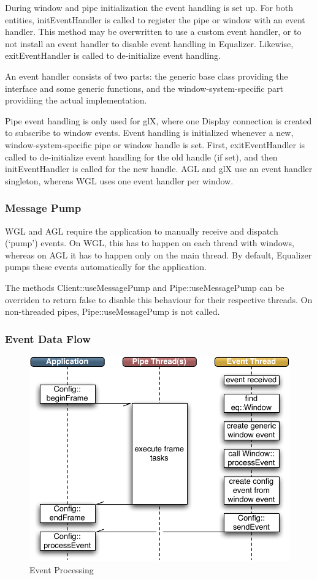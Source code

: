 \documentclass[10pt,a4]{scrartcl}
\begin{document}
During window and pipe initialization the event handling is set up. For
both entities, \textsf{initEvent\-Handler} is called to register the pipe
or window with an event handler. This method may be overwritten to use a
custom event handler, or to not install an event handler to disable
event handling in Equalizer. Likewise, \textsf{exitEventHandler} is
called to de-initialize event handling.

An event handler consists of two parts: the generic base class providing
the interface and some generic functions, and the window-system-specific
part providiing the actual implementation. 

Pipe event handling is only used for glX, where one \textsf{Display}
connection is created to subscribe to window events. Event handling is
initialized whenever a new, window-system-specific pipe or window handle
is set. First, \textsf{exitEventHandler} is called to de-initialize
event handling for the old handle (if set), and then
\textsf{initEvent\-Handler} is called for the new handle. AGL and glX use
an event handler singleton, whereas WGL uses one event handler per
window.

\subsubsection{Message Pump}

WGL and AGL require the application to manually receive and dispatch
(`pump') events. On WGL, this has to happen on each thread with windows,
whereas on AGL it has to happen only on the main thread. By default,
Equalizer pumps these events automatically for the application.

The methods \textsf{Client::useMessagePump} and
\textsf{Pipe::useMessagePump} can be overriden to return \textsf{false}
to disable this behaviour for their respective threads. On non-threaded
pipes, \textsf{Pipe::useMessagePump} is not called.


\subsubsection{Event Data Flow}

\begin{figure}
  \includegraphics[width=.4\textwidth]{images/eventHandling.pdf}
  {\caption{\small\label{fEventProcessing}Event Processing}}
\end{figure}
\end{document}
